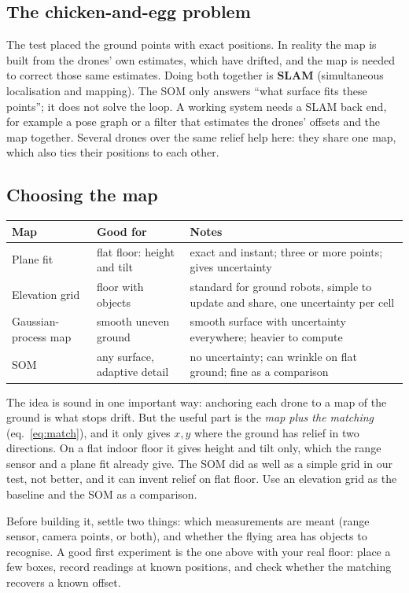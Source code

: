 \documentclass[11pt,a4paper]{article}
\begin{document}
\subsection{The chicken-and-egg problem}
The test placed the ground points with exact positions. In reality the map is built from the drones' own estimates,
which have drifted, and the map is needed to correct those same estimates. Doing both together is \textbf{SLAM}
(simultaneous localisation and mapping). The SOM only answers ``what surface fits these points''; it does not solve
the loop. A working system needs a SLAM back end, for example a pose graph or a filter that estimates the drones'
offsets and the map together. Several drones over the same relief help here: they share one map, which also ties
their positions to each other.

\subsection{Choosing the map}
\begin{center}\small
\begin{tabular}{@{}p{3.6cm}p{4.2cm}p{6.7cm}@{}}
\toprule
Map & Good for & Notes\\
\midrule
Plane fit & flat floor: height and tilt & exact and instant; three or more points; gives uncertainty\\
Elevation grid & floor with objects & standard for ground robots, simple to update and share, one uncertainty per cell\\
Gaussian-process map & smooth uneven ground & smooth surface with uncertainty everywhere; heavier to compute\\
SOM & any surface, adaptive detail & no uncertainty; can wrinkle on flat ground; fine as a comparison\\
\bottomrule
\end{tabular}
\end{center}

\begin{oursbox}
The idea is sound in one important way: anchoring each drone to a map of the ground is what stops drift. But the
useful part is the \emph{map plus the matching} (eq.~\ref{eq:match}), and it only gives $x,y$ where the ground has
relief in two directions. On a flat indoor floor it gives height and tilt only, which the range sensor and a plane
fit already give. The SOM did as well as a simple grid in our test, not better, and it can invent relief on flat
floor. Use an elevation grid as the baseline and the SOM as a comparison.

Before building it, settle two things: which measurements are meant (range sensor, camera points, or both), and
whether the flying area has objects to recognise. A good first experiment is the one above with your real floor:
place a few boxes, record readings at known positions, and check whether the matching recovers a known offset.
\end{oursbox}
\end{document}
